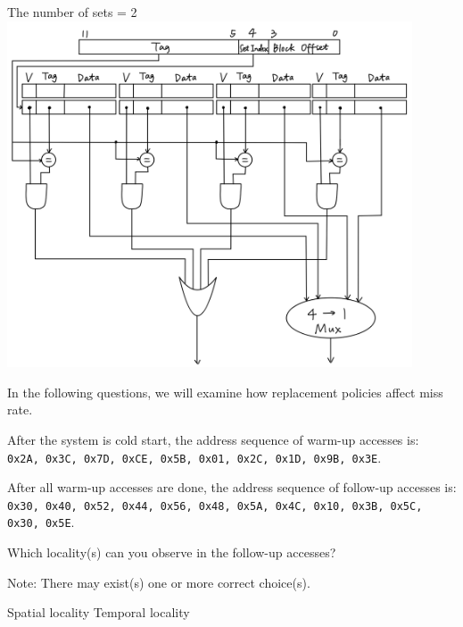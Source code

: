 \begin{questions}
{
    \begin{solution}
    The number of sets = 2
    \centering
    \includegraphics[width=0.9\textwidth]{img/cache.png}
    \end{solution}
}
\newpage

In the following questions, we will examine how replacement policies
affect miss rate.

After the system is cold start, the address sequence of warm-up
accesses is:\\
\texttt{0x2A, 0x3C, 0x7D, 0xCE, 0x5B, 0x01, 0x2C, 0x1D, 0x9B, 0x3E}.

After all warm-up accesses are done, the address sequence of
follow-up accesses is: \\
\texttt{0x30, 0x40, 0x52, 0x44, 0x56, 0x48, 0x5A, 0x4C, 0x10, 0x3B,
0x5C, 0x30, 0x5E}.

\question[2] Which locality(s) can you observe in the follow-up
accesses?

{

    \begin{solution}
        Note: There may exist(s) one or more correct choice(s).\\
        \begin{oneparcheckboxes}
            \CorrectChoice Spatial locality
            \CorrectChoice Temporal locality
        \end{oneparcheckboxes}
    \end{solution}

}
\end{questions}
